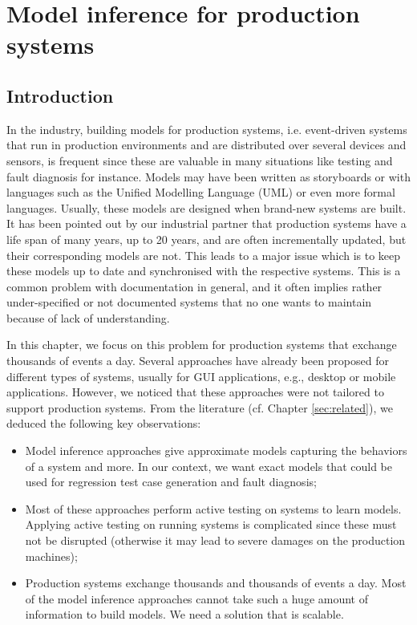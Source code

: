 \chapter{Model inference for production systems}
\label{sec:modelinf:prodsystems}

\minitoc

\section{Introduction}

In the industry, building models for production systems, i.e.
event-driven systems that run in production environments and are
distributed over several devices and sensors, is frequent since
these are valuable in many situations like testing and fault
diagnosis for instance. Models may have been written as
storyboards or with languages such as the Unified Modelling
Language (UML) or even more formal languages. Usually, these
models are designed when brand-new systems are built. It has been
pointed out by our industrial partner that production systems
have a life span of many years, up to 20 years, and are often
incrementally updated, but their corresponding models are not.
This leads to a major issue which is to keep these models up to
date and synchronised with the respective systems. This is a
common problem with documentation in general, and it often
implies rather under-specified or not documented systems that no
one wants to maintain because of lack of understanding.

In this chapter, we focus on this problem for production systems
that exchange thousands of events a day. Several approaches have
already been proposed for different types of systems, usually for
GUI applications, e.g., desktop or mobile applications. However,
we noticed that these approaches were not tailored to support
production systems. From the literature (cf. Chapter
\ref{sec:related}), we deduced the following key observations:


\begin{itemize}
    \item Model inference approaches give approximate models
        capturing the behaviors of a system and more. In our
        context, we want exact models that could be used for
        regression test case generation and fault diagnosis;

    \item Most of these approaches perform active testing on
        systems to learn models. Applying active testing on
        running systems is complicated since these must not be
        disrupted (otherwise it may lead to severe damages on the
        production machines);

    \item Production systems exchange thousands and thousands of
        events a day. Most of the model inference approaches
        cannot take such a huge amount of information to build
        models. We need a solution that is scalable.
\end{itemize}

